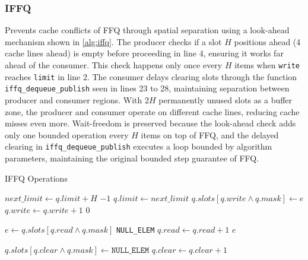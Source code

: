 \subsubsection{\acf{IFFQ}}
Prevents cache conflicts of \ac{FFQ} through spatial separation using a look-ahead mechanism shown in \cref{alg:iffq}. The producer checks if a slot $H$ positions ahead (4 cache lines ahead) is empty before proceeding in line 4, ensuring it works far ahead of the consumer. This check happens only once every $H$ items when \texttt{write} reaches \texttt{limit} in line 2. The consumer delays clearing slots through the function \texttt{iffq\_dequeue\_publish} seen in lines 23 to 28, maintaining separation between producer and consumer regions. With $2H$ permanently unused slots as a buffer zone, the producer and consumer operate on different cache lines, reducing cache misses even more. Wait-freedom is preserved because the look-ahead check adds only one bounded operation every $H$ items on top of \ac{FFQ}, and the delayed clearing in \texttt{iffq\_dequeue\_publish} executes a loop bounded by algorithm parameters, maintaining the original bounded step guarantee of \ac{FFQ}.\cite{MaffioneCacheAware}

\begin{algorithm}[!ht]
    \centering
    \captionsetup{justification=centering}
    \caption{\ac{IFFQ} Operations \cite{MaffioneCacheAware}}
    \label{alg:iffq}
    \scriptsize
    \begin{algorithmic}[1]
             
                \State $next\_limit \gets q.limit + H$
                    \State \Return $-1$ 
                \EndIf
                \State $q.limit \gets next\_limit$ 
            \EndIf
            \State $q.slots[q.write \land q.mask] \gets e$
            \State $q.write \gets q.write + 1$
            \State \Return $0$
        \EndFunction
        
        \State
        
            \State $e \gets q.slots[q.read \land q.mask]$
                \State \Return \texttt{NULL\_ELEM}
            \EndIf
            \State $q.read \gets q.read + 1$
            \State \Return $e$
        \EndFunction
        
        \State
        
                \State $q.slots[q.clear \land q.mask] \gets \texttt{NULL\_ELEM}$
                \State $q.clear \gets q.clear + 1$
            \EndWhile
        \EndFunction
    \end{algorithmic}
\end{algorithm}

